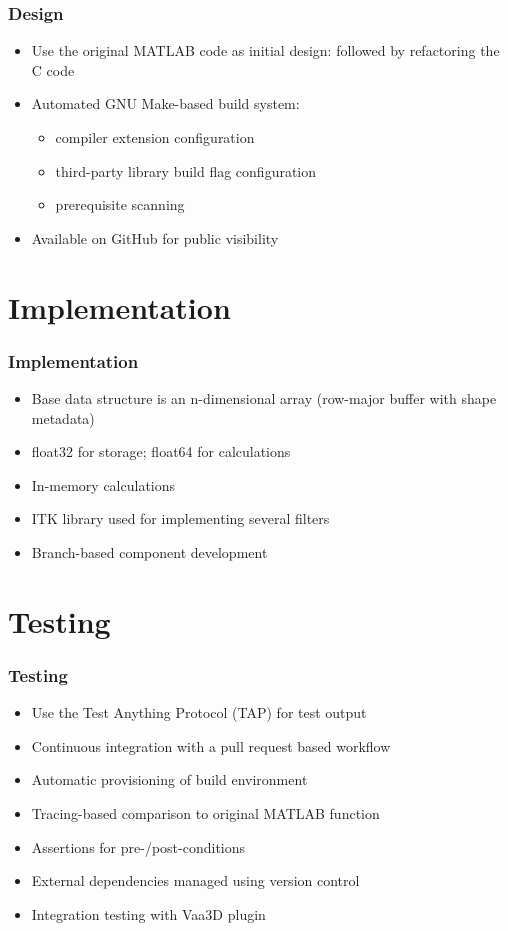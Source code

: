\documentclass[%
        hyperref={%
                pdfauthor={Zakariyya Mughal},%
                pdfpagemode={None},pdfpagelayout={SinglePage}},%
        xcolor={x11names}%
]{beamer}
\begin{document}
\begin{frame}
\frametitle{Design}
\begin{itemize}
	\item Use the original MATLAB code as initial design: followed by refactoring the C code
	\item Automated GNU Make-based build system:
		\begin{itemize}
			\item compiler extension configuration
			\item third-party library build flag configuration
			\item prerequisite scanning
		\end{itemize}
	\item Available on GitHub for public visibility
\end{itemize}
\end{frame}

\section{Implementation}

\begin{frame}
\frametitle{Implementation}
\begin{itemize}
	\item Base data structure is an n-dimensional array (row-major buffer with shape metadata)
	\item float32 for storage; float64 for calculations
	\item In-memory calculations
	\item ITK library used for implementing several filters
	\item Branch-based component development
\end{itemize}
\end{frame}

\section{Testing}

\begin{frame}
\frametitle{Testing}
\begin{itemize}
	\item Use the Test Anything Protocol (TAP) for test output
	\item Continuous integration with a pull request based workflow
	\item Automatic provisioning of build environment
	\item Tracing-based comparison to original MATLAB function
	\item Assertions for pre-/post-conditions
	\item External dependencies managed using version control
	\item Integration testing with Vaa3D plugin
\end{itemize}
\end{frame}
\end{document}
